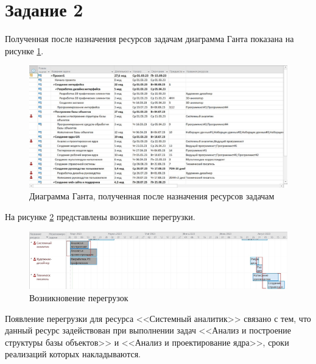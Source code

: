 \section*{Задание 2}

Полученная после назначения ресурсов задачам диаграмма Ганта показана на рисунке \ref{img:task2-diagram}.

\begin{figure}[H]
	\begin{center}
		\includegraphics[scale=0.45]{inc/img/task2-diagram.jpg}
	\end{center}
	\captionsetup{justification=centering}
	\caption{Диаграмма Ганта, полученная после назначения ресурсов задачам}
	\label{img:task2-diagram}
\end{figure}

На рисунке \ref{img:task2-overload} представлены возникшие перегрузки.

\begin{figure}[H]
	\begin{center}
		\includegraphics[scale=0.26]{inc/img/task2-overload.jpg}
	\end{center}
	\captionsetup{justification=centering}
	\caption{Возникновение перегрузок}
	\label{img:task2-overload}
\end{figure}

Появление перегрузки для ресурса <<Системный аналитик>> связано с тем, что данный ресурс задействован при выполнении задач <<Анализ и построение структуры базы объектов>> и <<Анализ и проектирование ядра>>, сроки реализаций которых накладываются.

